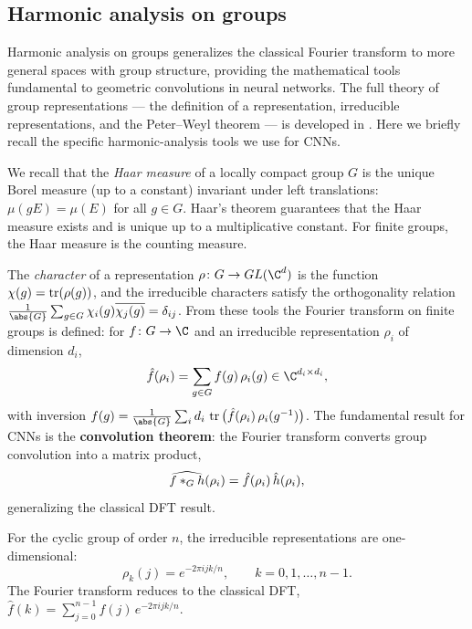 \subsection{Harmonic analysis on groups}
\label{sec:grids:harmonic-groups}

Harmonic analysis on groups generalizes the classical Fourier transform to more
general spaces with group structure, providing the mathematical tools
fundamental to geometric convolutions in neural networks. The full theory of
group representations --- the definition of a representation, irreducible
representations, and the Peter--Weyl theorem --- is developed in
. Here we briefly recall the specific harmonic-analysis
tools we use for CNNs.

We recall that the \emph{Haar measure} of a locally compact group $G$ is the
unique Borel measure (up to a constant) invariant under left translations:
$\mu(gE) = \mu(E)$ for all $g \in G$. Haar's theorem guarantees that the Haar
measure exists and is unique up to a multiplicative constant. For finite groups,
the Haar measure is the counting measure.

The \emph{character} of a representation $\rho \colon G \to GL(\C^d)$ is the
function $\chi(g) = \operatorname{tr}(\rho(g))$, and the irreducible characters satisfy the
orthogonality relation $\frac{1}{\abs{G}} \sum_{g \in G} \chi_i(g)
\overline{\chi_j(g)} = \delta_{ij}$. From these tools the Fourier transform on
finite groups is defined: for $f \colon G \to \C$ and an irreducible
representation $\rho_i$ of dimension $d_i$,
\begin{equation}
  \hat{f}(\rho_i) = \sum_{g\in G} f(g)\,\rho_i(g) \in \C^{d_i \times d_i},
  \label{eq:grids:fourier-finite-group}
\end{equation}
with inversion $f(g) = \frac{1}{\abs{G}} \sum_i d_i\, \tr\big(\hat{f}(\rho_i)\,
\rho_i(g^{-1})\big)$. The fundamental result for CNNs is the \textbf{convolution
theorem}: the Fourier transform converts group convolution into a matrix
product,
\begin{equation}
  \widehat{f *_G h}(\rho_i) = \hat{f}(\rho_i)\, \hat{h}(\rho_i),
  \label{eq:grids:conv-fourier-groups}
\end{equation}
generalizing the classical DFT result.

\begin{example}
\label{ex:grids:cyclic-group}
For the cyclic group of order $n$, the irreducible representations are
one-dimensional:
\[
  \rho_k(j) = e^{-2\pi i jk/n}, \qquad k = 0, 1, \ldots, n-1.
\]
The Fourier transform reduces to the classical DFT,
$\hat{f}(k) = \sum_{j=0}^{n-1} f(j)\, e^{-2\pi i jk/n}$.
\end{example}

